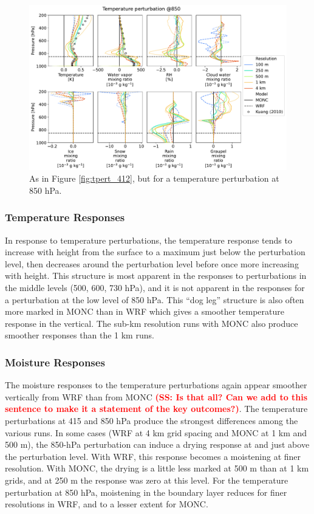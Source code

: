 \documentclass[draft]{agujournal2019}
\newcommand{\todo}[1]{\textcolor{red}{\textbf{(#1)}}}
\begin{document}
\begin{figure}[pth]
    \noindent\includegraphics[width=\textwidth]{figures/pert_diffs_T_0.5_@850}
    \caption{As in Figure \ref{fig:tpert_412}, but for a temperature
    perturbation at 850 hPa.}
    \label{fig:tpert_850}
\end{figure}

\subsubsection{Temperature Responses}

In response to temperature perturbations, the temperature response tends to
increase with height from the surface to a maximum just below the perturbation
level, then decreases around the perturbation level before once more increasing
with height. This structure is most apparent in the responses to perturbations
in the middle levels (500, 600, 730 hPa), and it is not apparent in the
responses for a perturbation at the low level of 850 hPa. This ``dog leg''
structure is also often more marked in MONC than in WRF which gives a smoother
temperature response in the vertical. The sub-km resolution runs with MONC also
produce smoother responses than the 1 km runs.

\subsubsection{Moisture Responses}

The moisture responses to the temperature perturbations again appear smoother
vertically from WRF than from MONC \todo{SS: Is that all?  Can we add to this
sentence to make it a statement of the key outcomes?}. The temperature
perturbations at 415 and 850 hPa produce the strongest differences among
the various runs. In some cases (WRF at 4 km grid spacing and MONC at 1 km and
500 m), the 850-hPa perturbation can induce a drying response at and just above
the perturbation level. With WRF, this response becomes a moistening at finer
resolution. With MONC, the drying is a little less marked at 500 m than at 1 km
grids, and at 250 m the response was zero at this level. For the temperature
perturbation at 850 hPa, moistening in the boundary layer reduces for finer
resolutions in WRF, and to a lesser extent for MONC. 
\end{document}
